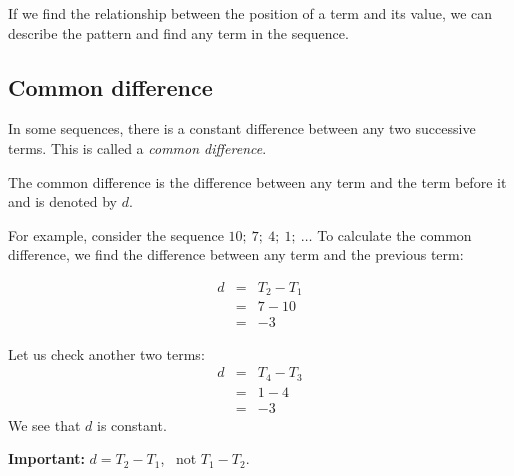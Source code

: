 If we find the relationship between the position of a term and its value, we can describe the pattern and find any term in the sequence.

\subsection*{Common difference}
In some sequences, there is a constant difference between any two
successive terms. This is called a \textit{common difference}.

 {The common difference is the difference between any term and the term before it and is denoted by $d$. } 

For example, consider the sequence $10;~7;~4;~1;~\ldots$ To calculate
the common difference, we find the difference between any term and the
previous term:

\begin{equation*}
    \begin{array}{ccl}d &=& T_{2} - T_{1}\\
      & =& 7-10\\& =&-3\end{array}
\end{equation*}

Let us check another two terms:
\begin{equation*}
    \begin{array}{ccl}d &=& T_{4} - T_{3}\\
    & =& 1-4\\& =&-3\end{array}
\end{equation*}
We see that $d$ is constant.
\par
\textbf{Important:} $d=T_{2}-T_{1}$, ~not $T_{1} -T_{2}$.
       
